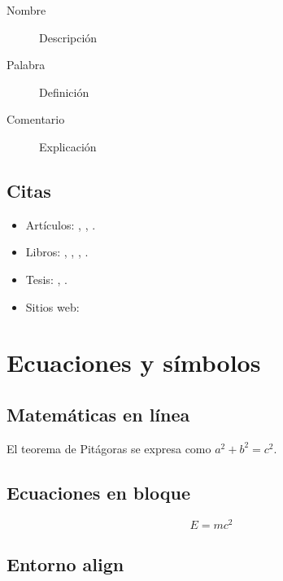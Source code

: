 \begin{description}
	\item[Nombre] Descripción
	\item[Palabra] Definición
	\item[Comentario] Explicación
\end{description}

\subsection{Citas}

\begin{itemize}
	\item Artículos: \cite{Sonneveldt2007}, \cite{Snell1992}, \cite{Bugajski1992}.
	\item Libros: \cite{Etkin1996}, \cite{Stevens2016}, \cite{Isidori1995}, \cite{Stengel2004}.
	\item Tesis: \cite{Harkegard2001}, \cite{Harkegard2003}.
	\item Sitios web: \cite{Github2026}
\end{itemize}


\section{Ecuaciones y símbolos}

\subsection{Matemáticas en línea}
El teorema de Pitágoras se expresa como $a^2 + b^2 = c^2$.

\subsection{Ecuaciones en bloque}

\begin{equation}
	E = mc^2
\end{equation}

\subsection{Entorno align}

